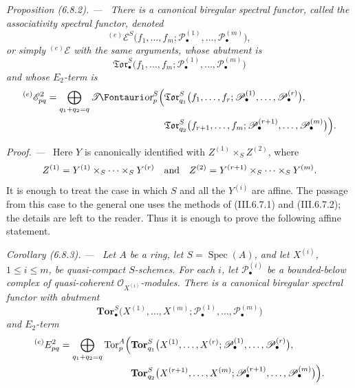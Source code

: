 \documentclass[10pt,oneside]{book}
\newcommand{\sh}[1]{\mathscr{#1}}
\newcommand{\shTor}{\sh{T}\textup{\kern-2.2pt{\Fontauri\slshape or}}}
\newcommand{\Spec}{\operatorname{Spec}}
\newcommand{\Tor}{\operatorname{Tor}}
\newcommand{\sref}[2][]{(#2)}
\newenvironment{proposition}[1][]{\par\medskip\noindent\itshape Proposition (#1). ---\ }{\par}
\newenvironment{corollary}[1][]{\par\medskip\noindent\itshape Corollary (#1). ---\ }{\par}
\newenvironment{proof}{\par\medskip\noindent\textit{Proof. ---\ }}{\par}
\begin{document}
\begin{proposition}[6.8.2]
\label{III.6.8.2}
There is a canonical biregular spectral functor, called the
\emph{associativity spectral functor}, denoted
\[
  {}^{(e)}\sh E^S
  \bigl(
    f_1,\ldots,f_m;
    \sh P_\bullet^{(1)},\ldots,\sh P_\bullet^{(m)}
  \bigr),
\]
or simply ${}^{(e)}\sh E$ with the same arguments, whose abutment
is
\[
  \mathfrak{Tor}_\bullet^S
  \bigl(
    f_1,\ldots,f_m;
    \sh P_\bullet^{(1)},\ldots,\sh P_\bullet^{(m)}
  \bigr)
\]
and whose $E_2$-term is
\[
\begin{split}
  {}^{(e)}\sh E_{pq}^2
  =
  \bigoplus_{q_1+q_2=q}
  \shTor_p^S
  \Bigl(
    &
    \mathfrak{Tor}_{q_1}^S
    \bigl(
      f_1,\ldots,f_r;
      \sh P_\bullet^{(1)},\ldots,\sh P_\bullet^{(r)}
    \bigr),
    \\
    &
    \mathfrak{Tor}_{q_2}^S
    \bigl(
      f_{r+1},\ldots,f_m;
      \sh P_\bullet^{(r+1)},\ldots,\sh P_\bullet^{(m)}
    \bigr)
  \Bigr).
\end{split}
\]
\end{proposition}

\begin{proof}
Here $Y$ is canonically identified with
$Z^{(1)}\times_SZ^{(2)}$, where
\[
  Z^{(1)}
  =
  Y^{(1)}\times_S\cdots\times_SY^{(r)}
  \quad\hbox{and}\quad
  Z^{(2)}
  =
  Y^{(r+1)}\times_S\cdots\times_SY^{(m)}.
\]
It is enough to treat the case in which $S$ and all the
$Y^{(i)}$ are affine.  The passage from this case to the general
one uses the methods of \sref{III.6.7.1} and
\sref{III.6.7.2}; the details are left to the reader.  Thus it is
enough to prove the following affine statement.
\end{proof}

\begin{corollary}[6.8.3]
\label{III.6.8.3}
Let $A$ be a ring, let $S=\Spec(A)$, and let $X^{(i)}$,
$1\leq i\leq m$, be quasi-compact $S$-schemes.  For each $i$, let
$\sh P_\bullet^{(i)}$ be a bounded-below complex of
quasi-coherent $\sh O_{X^{(i)}}$-modules.  There is a canonical
biregular spectral functor with abutment
\[
  \mathbf{Tor}_\bullet^S
  \bigl(
    X^{(1)},\ldots,X^{(m)};
    \sh P_\bullet^{(1)},\ldots,\sh P_\bullet^{(m)}
  \bigr)
\]
and $E_2$-term
\[
\begin{split}
  {}^{(e)}E_{pq}^2
  =
  \bigoplus_{q_1+q_2=q}
  \Tor_p^A
  \Bigl(
    &
    \mathbf{Tor}_{q_1}^S
    \bigl(
      X^{(1)},\ldots,X^{(r)};
      \sh P_\bullet^{(1)},\ldots,\sh P_\bullet^{(r)}
    \bigr),
    \\
    &
    \mathbf{Tor}_{q_2}^S
    \bigl(
      X^{(r+1)},\ldots,X^{(m)};
      \sh P_\bullet^{(r+1)},\ldots,\sh P_\bullet^{(m)}
    \bigr)
  \Bigr).
\end{split}
\]
\end{corollary}
\end{document}
